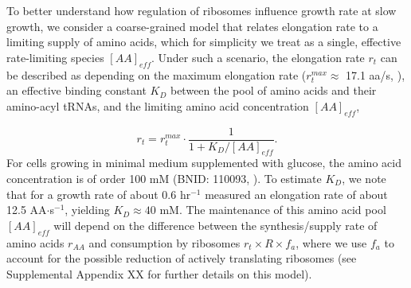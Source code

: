 


To better understand how regulation of ribosomes influence growth rate at
slow growth, we consider a coarse-grained model that relates elongation
rate to a limiting supply of amino acids, which for simplicity we treat as a
single, effective rate-limiting species $[AA]_{eff}$. Under such a scenario, the elongation
rate $r_t$ can be described as depending on the maximum elongation rate ($r_t^{max}
\approx$ 17.1 aa/s, \citep{dai2016, dai2018}), an effective binding constant
$K_D$ between the pool of amino acids and their amino-acyl tRNAs, and the limiting
amino acid concentration $[AA]_{eff}$,

\begin{equation}
r_t = r_t^{max} \cdot \frac{1}{1 + K_D / [AA]_{eff}}.
\label{eq:rate_Kd}
\end{equation}
For cells growing in minimal medium supplemented with glucose, the amino acid
concentration is of order 100 mM (BNID: 110093, \citep{milo2010, bennett2009}).
To estimate  $K_D$, we note that for a growth rate of about 0.6 hr$^{-1}$
\cite{dai2016} measured an elongation rate of about 12.5 AA$\cdot$s$^{-1}$,
yielding $K_D \approx 40$ mM. The maintenance of this amino acid pool
$[AA]_{eff}$ will depend on the difference between the synthesis/supply rate of
amino acids $r_{AA}$ and consumption by ribosomes $r_t \times R \times f_a$,
where we use $f_a$ to account for the possible reduction of actively translating
ribosomes (see Supplemental Appendix XX for further details on this model).

